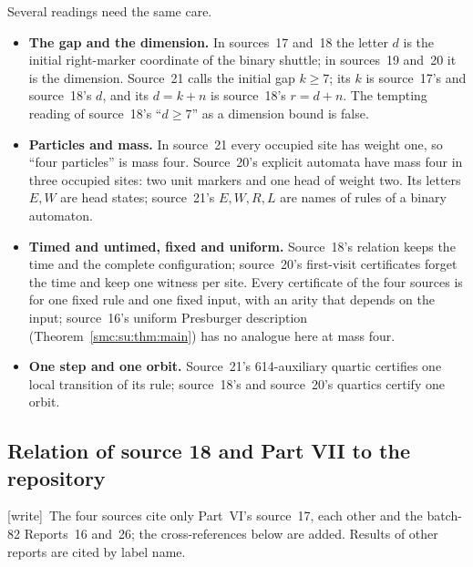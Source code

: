 \documentclass[11pt,letterpaper]{article}
\numberwithin{equation}{section}
\theoremstyle{definition}
\theoremstyle{remark}
\newcommand{\wtag}{\textup{[write]}}
\begin{document}
Several readings need the same care.
\begin{itemize}
\item \textbf{The gap and the dimension.} In sources~17 and~18 the letter $d$ is the initial right-marker coordinate of the binary shuttle; in sources~19 and~20 it is the dimension. Source~21 calls the initial gap $k\ge7$; its $k$ is source~17's and source~18's $d$, and its $d=k+n$ is source~18's $r=d+n$. The tempting reading of source~18's ``$d\ge7$'' as a dimension bound is false.
\item \textbf{Particles and mass.} In source~21 every occupied site has weight one, so ``four particles'' is mass four. Source~20's explicit automata have mass four in three occupied sites: two unit markers and one head of weight two. Its letters $E,W$ are head states; source~21's $E,W,R,L$ are names of rules of a binary automaton.
\item \textbf{Timed and untimed, fixed and uniform.} Source~18's relation keeps the time and the complete configuration; source~20's first-visit certificates forget the time and keep one witness per site. Every certificate of the four sources is for one fixed rule and one fixed input, with an arity that depends on the input; source~16's uniform Presburger description (Theorem~\ref{smc:su:thm:main}) has no analogue here at mass four.
\item \textbf{One step and one orbit.} Source~21's 614-auxiliary quartic certifies one local transition of its rule; source~18's and source~20's quartics certify one orbit.
\end{itemize}

\subsection{Relation of source 18 and Part VII to the repository}\label{smc:zd:sec:relation}

\wtag\ The four sources cite only Part~VI's source~17, each other and the batch-82 Reports~16 and~26; the cross-references below are added. Results of other reports are cited by label name.
\end{document}
